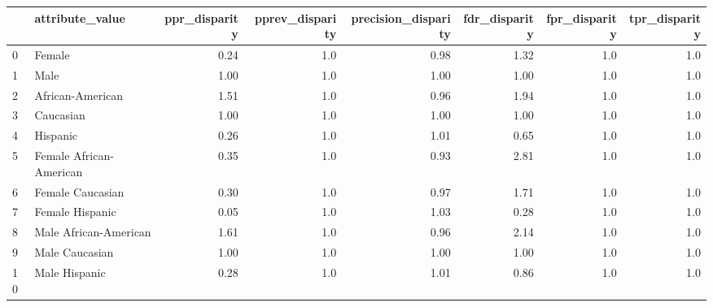 \begin{tabular}{llrrrrrr}
\toprule
{} &          attribute\_value &  ppr\_disparity &  pprev\_disparity &  precision\_disparity &  fdr\_disparity &  fpr\_disparity &  tpr\_disparity \\
\midrule
0  &                   Female &           0.24 &              1.0 &                 0.98 &           1.32 &            1.0 &            1.0 \\
1  &                     Male &           1.00 &              1.0 &                 1.00 &           1.00 &            1.0 &            1.0 \\
2  &         African-American &           1.51 &              1.0 &                 0.96 &           1.94 &            1.0 &            1.0 \\
3  &                Caucasian &           1.00 &              1.0 &                 1.00 &           1.00 &            1.0 &            1.0 \\
4  &                 Hispanic &           0.26 &              1.0 &                 1.01 &           0.65 &            1.0 &            1.0 \\
5  &  Female African-American &           0.35 &              1.0 &                 0.93 &           2.81 &            1.0 &            1.0 \\
6  &         Female Caucasian &           0.30 &              1.0 &                 0.97 &           1.71 &            1.0 &            1.0 \\
7  &          Female Hispanic &           0.05 &              1.0 &                 1.03 &           0.28 &            1.0 &            1.0 \\
8  &    Male African-American &           1.61 &              1.0 &                 0.96 &           2.14 &            1.0 &            1.0 \\
9  &           Male Caucasian &           1.00 &              1.0 &                 1.00 &           1.00 &            1.0 &            1.0 \\
10 &            Male Hispanic &           0.28 &              1.0 &                 1.01 &           0.86 &            1.0 &            1.0 \\
\bottomrule
\end{tabular}
